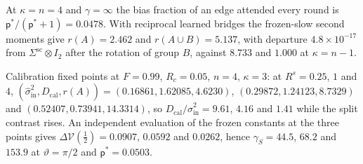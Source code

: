 \begin{numcheck}\label{chk:frm-capacity}
At $\kappa=n=4$ and $\gamma=\infty$ the bias fraction of an edge attended every round is $\mathsf p^\ast/(\mathsf p^\ast+1)=0.0478$. With reciprocal learned bridges the frozen-slow second moments give $r(A)=2.462$ and $r(A\cup B)=5.137$, with departure $4.8\times10^{-17}$ from $\Sigma^{\mathrm{sc}}\otimes I_2$ after the rotation of group $B$, against $8.733$ and $1.000$ at $\kappa=n-1$.
\end{numcheck}

\begin{numcheck}\label{chk:frm-grounding}
Calibration fixed points at $F=0.99$, $R_c=0.05$, $n=4$, $\kappa=3$: at $R^s=0.25$, $1$ and $4$, $(\hat\sigma^2_{\mathrm{in}},D_{\mathrm{cal}},r(A))=(0.16861,1.62085,4.6230)$, $(0.29872,1.24123,8.7329)$ and $(0.52407,0.73941,14.3314)$, so $D_{\mathrm{cal}}/\hat\sigma^2_{\mathrm{in}}=9.61$, $4.16$ and $1.41$ while the split contrast rises. An independent evaluation of the frozen constants at the three points gives $\Delta\mathcal V(\frac12)=0.0907$, $0.0592$ and $0.0262$, hence $\gamma_S=44.5$, $68.2$ and $153.9$ at $\vartheta=\pi/2$ and $\mathsf p^\ast=0.0503$.
\end{numcheck}
